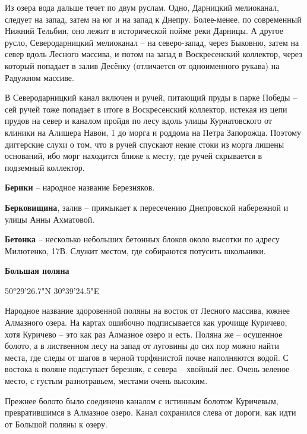Из озера вода дальше течет по двум руслам. Одно, Дарницкий мелиоканал, следует на запад, затем на юг и на запад к Днепру. Более-менее, по современный Нижний Тельбин, оно лежит в исторической пойме реки Дарницы. А другое русло, Северодарницкий мелиоканал – на северо-запад, через Быковню, затем на север вдоль Лесного массива, и потом на запад в Воскресенский коллектор, через который попадает в залив Десёнку (отличается от одноименного рукава) на Радужном массиве. 

В Северодарницкий канал включен и ручей, питающий пруды в парке Победы – сей ручей тоже попадает в итоге в Воскресенский коллектор, истекая из цепи прудов на север и каналом пройдя по лесу вдоль улицы Курнатовского от клиники на Алишера Навои, 1 до морга и роддома на Петра Запорожца. Поэтому диггерские слухи о том, что в ручей спускают некие стоки из морга лишены оснований, ибо морг находится ближе к месту, где ручей скрывается в подземный коллектор.\\

\medskip

\textbf{Берики} – народное название Березняков.\\

\medskip

\textbf{Берковищина}, залив – примыкает к пересечению Днепровской набережной и 
улицы Анны Ахматовой.\\

\medskip

\textbf{Бетонка} – несколько небольших бетонных блоков около высотки по адресу Милютенко, 17В. Служит местом, где собираются потусить школьники.\\

\medskip

\textbf{Большая поляна}

50°29'26.7"N 30°39'24.5"E

Народное название здоровенной поляны на восток от Лесного массива, южнее Алмазного озера. На картах ошибочно подписывается как урочище Куричево, хотя Куричево – это как раз Алмазное озеро и есть. Поляна же – осушенное болото, а в лиственном лесу на запад от луговины до сих пор можно найти места, где следы от шагов в черной торфянистой почве наполняются водой. С востока к поляне подступает березняк, с севера – хвойный лес. Очень зеленое место, с густым разнотравьем, местами очень высоким.

Прежнее болото было соединено каналом с истинным болотом Куричевым, превратившимся в Алмазное озеро. Канал сохранился слева от дороги, как идти от Большой поляны к озеру.

